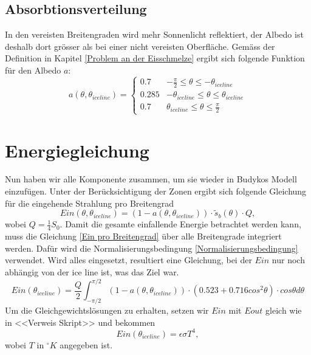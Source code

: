 \begin{refsection}
\subsection{Absorbtionsverteilung}
In den vereisten Breitengraden wird mehr Sonnenlicht reflektiert, der Albedo ist deshalb dort grösser als bei einer nicht vereisten Oberfläche. Gemäss der Definition in Kapitel \ref{Problem an der Eisschmelze} ergibt sich folgende Funktion für den Albedo $a$:
\begin{equation}\label{Albedoverteilung}
a(\theta,\theta_{iceline})
=
\begin{cases}
	0.7&-\tfrac{\pi}{2}\leq\theta\leq-\theta_{iceline}\\
	0.285&-\theta_{iceline}\leq\theta\leq\theta_{iceline} \\
	0.7&\theta_{iceline}\leq\theta\leq\tfrac{\pi}{2}
\end{cases}
\end{equation}
\section{Energiegleichung}
Nun haben wir alle Komponente zusammen, um sie wieder in Budykos Modell einzufügen. Unter der Berücksichtigung der Zonen ergibt sich folgende Gleichung für die eingehende Strahlung pro Breitengrad
\begin{equation}\label{Ein pro Breitengrad}
Ein(\theta,\theta_{iceline})
=
(1-a(\theta,\theta_{iceline}))\cdot\tilde{s}_{b}(\theta)\cdot Q,
\end{equation}
wobei $Q=\tfrac{1}{4}S_{0}$. Damit die gesamte einfallende Energie betrachtet werden kann, muss die Gleichung \ref{Ein pro Breitengrad} über alle Breitengrade integriert werden. Dafür wird die Normalisierungsbedingung \ref{Normalisierungsbedingung} verwendet. Wird alles eingesetzt, resultiert eine Gleichung, bei der $Ein$ nur noch abhängig von der ice line ist, was das Ziel war.
\begin{equation}\label{Ein abh ice line}
Ein(\theta_{iceline})
=
\frac{Q}{2}\int_{-\pi/2}^{\pi/2}(1-a(\theta,\theta_{iceline}))\cdot(0.523+0.716cos^2\theta)\cdot cos\theta d\theta
\end{equation}
Um die Gleichgewichtslösungen zu erhalten, setzen wir $Ein$ mit $Eout$ gleich wie in <<Verweis Skript>> und bekommen
\begin{equation}\label{Gleichgewichtsgleichung}
	Ein(\theta_{iceline})
	=
	\epsilon\sigma T^4,
\end{equation}
wobei $T$ in $^{\circ}K$ angegeben ist.

\end{refsection}
